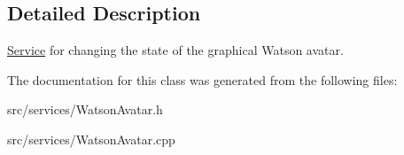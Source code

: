 \subsection{Detailed Description}
\hyperlink{struct_service}{Service} for changing the state of the graphical Watson avatar. 

The documentation for this class was generated from the following files\+:\begin{DoxyCompactItemize}
\item 
src/services/Watson\+Avatar.\+h\item 
src/services/Watson\+Avatar.\+cpp\end{DoxyCompactItemize}
